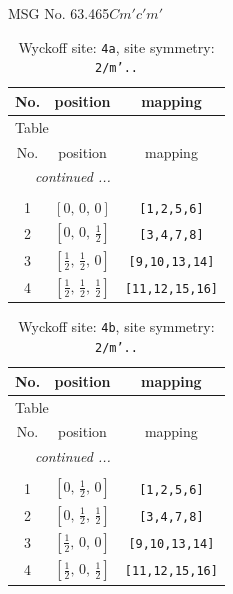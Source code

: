 \documentclass[fleqn,8pt]{jsarticle}
\begin{document}
\setcounter{MaxMatrixCols}{32}

\renewcommand{\tablename}{Table~}
\renewcommand{\figurename}{Figure~}
\begin{center}
\LARGE
MSG No. 63.465\quad$Cm'c'm'$
\end{center}
\renewcommand{\arraystretch}{1.2}
\begin{longtable}{ccc}
\caption{Wyckoff site: {\tt 4a}, site symmetry: {\tt 2/m'..}}
 \\
 \hline \hline
No. & position & mapping \\ \hline \endfirsthead

\multicolumn{2}{l}{\tablename\ \thetable{}} \\
 \hline \hline
No. & position & mapping \\ \hline \endhead

 \hline \hline
\multicolumn{2}{r}{\footnotesize\it continued ...} \\ \endfoot

 \hline \hline
\multicolumn{2}{r}{} \\ \endlastfoot

1 & $\left[ 0,\, 0,\, 0 \right]$ & {\tt [1,2,5,6]} \\ \hline
2 & $\left[ 0,\, 0,\, \frac{1}{2} \right]$ & {\tt [3,4,7,8]} \\ \hline
3 & $\left[ \frac{1}{2},\, \frac{1}{2},\, 0 \right]$ & {\tt [9,10,13,14]} \\ \hline
4 & $\left[ \frac{1}{2},\, \frac{1}{2},\, \frac{1}{2} \right]$ & {\tt [11,12,15,16]} \\
\end{longtable}
\renewcommand{\arraystretch}{1.2}
\begin{longtable}{ccc}
\caption{Wyckoff site: {\tt 4b}, site symmetry: {\tt 2/m'..}}
 \\
 \hline \hline
No. & position & mapping \\ \hline \endfirsthead

\multicolumn{2}{l}{\tablename\ \thetable{}} \\
 \hline \hline
No. & position & mapping \\ \hline \endhead

 \hline \hline
\multicolumn{2}{r}{\footnotesize\it continued ...} \\ \endfoot

 \hline \hline
\multicolumn{2}{r}{} \\ \endlastfoot

1 & $\left[ 0,\, \frac{1}{2},\, 0 \right]$ & {\tt [1,2,5,6]} \\ \hline
2 & $\left[ 0,\, \frac{1}{2},\, \frac{1}{2} \right]$ & {\tt [3,4,7,8]} \\ \hline
3 & $\left[ \frac{1}{2},\, 0,\, 0 \right]$ & {\tt [9,10,13,14]} \\ \hline
4 & $\left[ \frac{1}{2},\, 0,\, \frac{1}{2} \right]$ & {\tt [11,12,15,16]} \\
\end{longtable}
\end{document}
